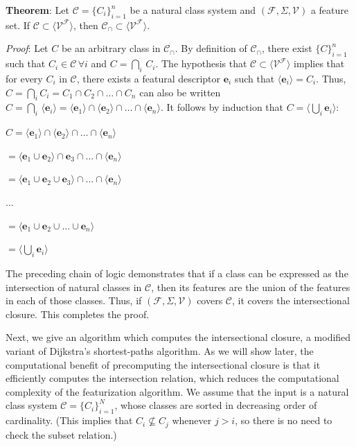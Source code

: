 \documentclass[11pt, oneside]{article}   	%
\begin{document}
\vspace{\baselineskip} \noindent \textbf{Theorem}: Let $\mathcal C = \{C_i\}_{i=1}^n$ be a natural class system and $(\mathcal F, \Sigma, \mathcal V)$ a feature set. If $\mathcal C \subset \langle \mathcal V^\mathcal F \rangle$, then $\mathcal C_\cap \subset\langle \mathcal V^\mathcal F \rangle $.

\textit{Proof}: Let $C$ be an arbitrary class in $\mathcal C_\cap$. By definition of $\mathcal C_\cap$, there exist $\{C\}_{i=1}^n$ such that $C_i \in \mathcal C \, \forall i$ and $C = \bigcap_i \, C_i$. The hypothesis that $\mathcal C \subset \langle \mathcal V^\mathcal F \rangle $ implies that for every $C_i$ in $\mathcal C$, there exists a featural descriptor $\mathbf{e}_i$ such that $\langle \mathbf{e}_i \rangle = C_i$. Thus, $C = \bigcap_i C_i = C_1 \cap C_2 \cap \ldots \cap C_n$ can also be written $C = \bigcap_i \, \langle \mathbf{e}_i \rangle = \langle \mathbf{e}_1 \rangle \cap  \langle \mathbf{e}_2 \rangle \cap \ldots \cap  \langle \mathbf{e}_n \rangle$. It follows by induction that $C = \langle \bigcup_i  \mathbf{e}_i \rangle$:

$C = \langle \mathbf{e}_1 \rangle \cap  \langle \mathbf{e}_2 \rangle \cap \ldots \cap  \langle \mathbf{e}_n \rangle$

$ = \langle \mathbf{e}_1 \cup \mathbf{e}_2 \rangle \cap \mathbf{e}_3 \cap \ldots \cap \langle \mathbf{e}_n \rangle$

$ = \langle \mathbf{e}_1 \cup \mathbf{e}_2 \cup \mathbf{e}_3 \rangle \cap \ldots \cap \langle \mathbf{e}_n \rangle$

$\ldots$

$= \langle \mathbf{e}_1 \cup \mathbf{e}_2 \cup \ldots \cup \mathbf{e}_n \rangle$

$= \langle \bigcup_i  \mathbf{e}_i \rangle$

\noindent The preceding chain of logic demonstrates that if a class can be expressed as the intersection of natural classes in $\mathcal C$, then its features are the union of the features in each of those classes. Thus, if $(\mathcal F, \Sigma, \mathcal V)$ covers $\mathcal C$, it covers the intersectional closure. This completes the proof.


\vspace{\baselineskip} Next, we give an algorithm which computes the intersectional closure, a modified variant of Dijkstra's shortest-paths algorithm. As we will show later, the computational benefit of precomputing the intersectional closure is that it efficiently computes the intersection relation, which reduces the computational complexity of the featurization algorithm. We assume that the input is a natural class system $\mathcal C = \{C_i\}_{i=1}^N$, whose classes are sorted in decreasing order of cardinality. (This implies that $C_i \nsubseteq C_j$ whenever $j > i$, so there is no need to check the subset relation.)
\end{document}
